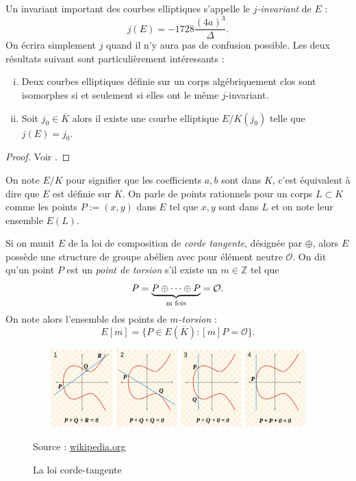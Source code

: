 \documentclass[a4paper]{article} %
\numberwithin{section}{part}
\numberwithin{equation}{section}
\newcommand\ZZ{\mathbb{Z}}
\newcommand\EO{\mathcal{O}}
\begin{document}
Un invariant important des courbes elliptiques s'appelle le \emph{$j$-invariant}
de $E$ :
\begin{equation}
j(E) = -1728\dfrac{(4a)^3}{\Delta}.
\end{equation}
On écrira simplement $j$ quand il n'y aura pas de confusion possible. Les deux
résultats suivant sont particulièrement intéressants :
\begin{prop}
\label{prop:j-invariant}
\begin{enumerate}[(i)]
    \item Deux courbes elliptiques définie sur un corps algébriquement clos 
        sont isomorphes si et seulement si elles ont le même $j$-invariant.
    \item Soit $j_0\in\overline{K}$ alors il existe une courbe elliptique
    $E/K(j_0)$ telle que $j(E) = j_0$.
\end{enumerate}
\end{prop}
\begin{proof}
Voir \cite[p. 45, prop. 1.4]{Sil}.
\end{proof}
On note $E/K$ pour signifier que les coefficients $a, b$ sont dans $K$, c'est
équivalent à dire que $E$ est définie sur $K$. On parle de points rationnels 
pour un corps $L\subset K$ comme les points
$P := (x,y)$ dans $E$ tel que $x, y$ sont dans $L$ et on note leur ensemble
$E(L)$.\par
\vspace{0.3cm}
Si on munit $E$ de la loi de composition de \emph{corde tangente}, désignée par
$\oplus$, alors $E$ possède une structure de groupe abélien avec pour élément 
neutre $\EO$. On dit qu'un point $P$ est un \emph{point de torsion} s'il existe 
un $m\in\ZZ$ tel que 
\begin{equation}
[m]P = \underbrace{P\oplus\dots\oplus P}_{\textup{m fois}} = \EO.
\end{equation}
On note alors l'ensemble des points de \emph{$m$-torsion} :
\begin{equation}
E[m] = \lbrace{P\in E(\overline{K}) : [m]P = \EO}\rbrace.
\end{equation}

\begin{figure}[H]
\begin{center}
\includegraphics[width=12cm, height=3cm]{CordeTangente}
\caption{La loi corde-tangente}
\label{fig:cordetangente}
Source : 
\href{http://en.wikipedia.org/wiki/Elliptic_curve}{wikipedia.org}
\end{center}
\end{figure}
\end{document}
